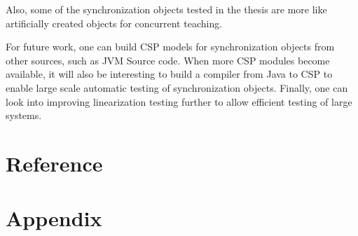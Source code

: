 \documentclass[a4paper, 12pt]{article}
\begin{document}
Also, some of the synchronization objects tested in the thesis are more like artificially created objects for concurrent teaching. 

For future work, one can build CSP models for synchronization objects from other sources, such as JVM Source code. When more CSP modules become available, it will also be interesting to build a compiler from Java to CSP to enable large scale automatic testing of synchronization objects. Finally, one can look into improving linearization testing further to allow efficient testing of large systems. 

\newpage
\section{Reference}



\newpage
\section{Appendix}
\end{document}
